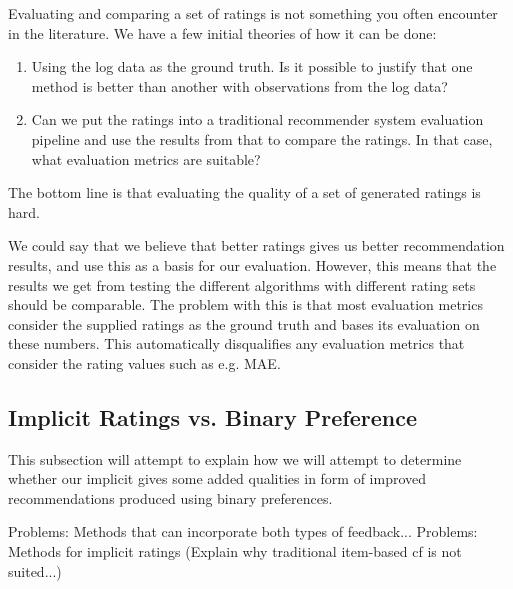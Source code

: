 Evaluating and comparing a set of ratings is not something you often encounter in the literature.
We have a few initial theories of how it can be done:

\begin{enumerate}
\item Using the log data as the ground truth. Is it possible to justify that one method is better than another with observations from the log data?
\item Can we put the ratings into a traditional recommender system evaluation pipeline and use the results from that to compare the ratings. In that case, what evaluation metrics are suitable?
\end{enumerate}

The bottom line is that evaluating the quality of a set of generated ratings is hard. 



We could say that we believe that better ratings gives us better recommendation results, and use this as a basis for our evaluation. However, this means that the results we get from testing the different algorithms with different rating sets should be comparable. The problem with this is that most evaluation metrics consider the supplied ratings as the ground truth and bases its evaluation on these numbers. This automatically disqualifies any evaluation metrics that consider the rating values such as e.g. MAE.


\subsection{Implicit Ratings vs. Binary Preference}

This subsection will attempt to explain how we will attempt to determine whether our implicit gives some added
qualities in form of improved recommendations produced using binary preferences.

Problems: Methods that can incorporate both types of feedback...
Problems: Methods for implicit ratings (Explain why traditional item-based cf is not suited...)

